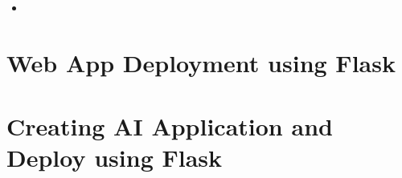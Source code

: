 \documentclass{article}
\begin{document}
\subsection{}
\begin{itemize}
    \item
\end{itemize}

\newpage
\section{Web App Deployment using Flask}


\newpage
\section{Creating AI Application and Deploy using Flask}



\end{document}
